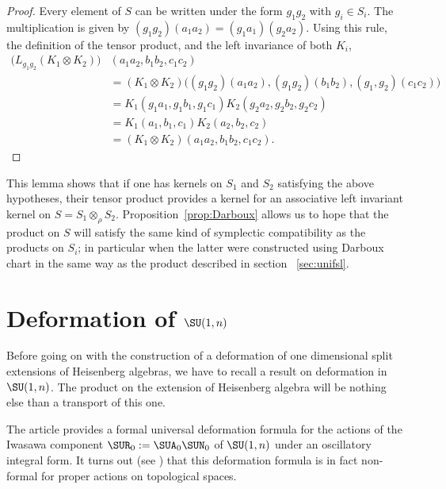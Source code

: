 \begin{proof}
	Every element of $S$ can be written under the form $g_1g_2$ with $g_i\in S_i$. The multiplication is given by $(g_1g_2)(a_1a_2)=(g_1a_1)(g_2a_2)$. Using this rule, the definition of the tensor product, and the left invariance of both $K_i$,
	\[
		\begin{split}
			\big( L_{g_1g_2}(K_1\otimes K_2) \big)&(a_1a_2,b_1b_2,c_1c_2)\\
			&=(K_1\otimes K_2)\big( (g_1g_2)(a_1a_2),(g_1g_2)(b_1b_2),(g_1,g_2)(c_1c_2) \big)\\
			&=K_1(g_1a_1,g_1b_1,g_1c_1)K_2(g_2a_2,g_2b_2,g_2c_2)\\
			&=K_1(a_1,b_1,c_1)K_2(a_2,b_2,c_2)\\
			&=(K_1\otimes K_2)(a_1a_2,b_1b_2,c_1c_2).
		\end{split}
	\]

\end{proof}

This lemma shows that if one has kernels on $S_1$ and $S_2$ satisfying the above hypotheses, their tensor product provides a kernel for an associative left invariant kernel on $S=S_1\otimes_{\rho} S_2$.  Proposition~\ref{prop:Darboux} allows us to hope that the product on $S$ will satisfy the same kind of symplectic compatibility as the products on $S_i$; in particular when the latter were constructed using Darboux chart in the same way as the product described in section ~\ref{sec:unifsl}.


\section{Deformation of \texorpdfstring{$\SU(1,n)$}{SU1n}}   \label{SecDefSURme}

Before going on with the construction of a deformation of one dimensional split extensions of Heisenberg algebras, we have to recall a result on deformation in $\SU(1,n)$. The product on the extension of Heisenberg algebra will be nothing else than a transport of this one.

The article \cite{Biel-Massar} provides a formal universal deformation formula for the actions of the Iwasawa component $\SUR_0:=\SUA_0\SUN_0$ of $\SU(1,n)$ under an oscillatory integral form.  It turns out (see \cite{lcBBM}) that this deformation formula is in fact non-formal for proper actions on topological spaces.

